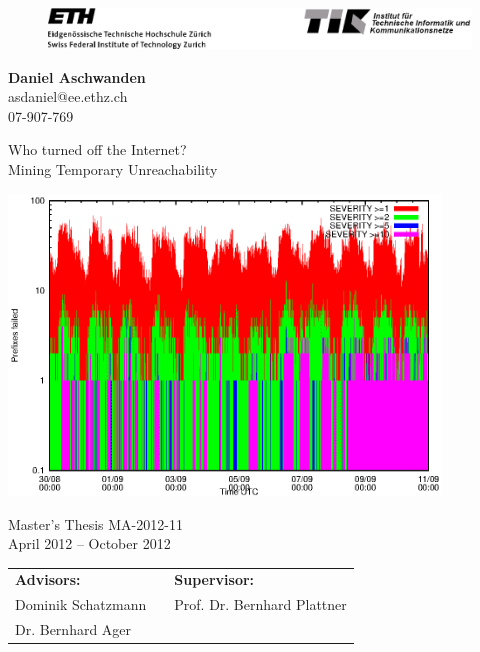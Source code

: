 

\begin{titlepage}
	\begin{center}
		\begin{figure}
			[!t] 
			\includegraphics[width=
			\textwidth]{images/TIKETHhdr.eps} 
		\end{figure}
	\end{center}
	
	\vspace{2mm} \textbf{Daniel Aschwanden}\\
	asdaniel@ee.ethz.ch\\
	07-907-769
	\vspace{2mm}
	
	{\Huge 
	\begin{flushleft}
		Who turned off the Internet?\\
		\LARGE Mining Temporary
		Unreachability 
	\end{flushleft}
	} \vspace{3mm} \centering
	\includegraphics[height=8cm]{images/prefix_failed_ipv4.eps}
	
	\vspace{3mm}
	
	Master's Thesis MA-2012-11\\
	April 2012 -- October 2012\\
	
	\vspace{5mm} 
	\begin{tabular}
		{l p{} l} \textbf{Advisors:} &&
		\textbf{Supervisor:} \\
		Dominik Schatzmann && Prof. Dr. Bernhard Plattner\\
		Dr. Bernhard Ager && \\
	\end{tabular}
	

\end{titlepage}
